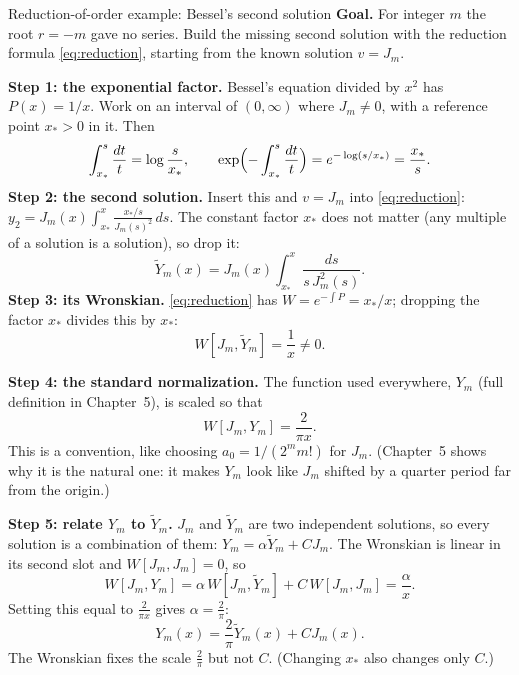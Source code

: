 \documentclass[11pt]{beamer}
\begin{document}
\begin{frame}[allowframebreaks=1.00]{Reduction-of-order example: Bessel's second solution}
\footnotesize
\textbf{Goal.} For integer \(m\) the root \(r=-m\) gave no series. Build the missing second solution
with the reduction formula \eqref{eq:reduction}, starting from the known solution \(v=J_m\).

\textbf{Step 1: the exponential factor.} Bessel's equation divided by \(x^2\) has \(P(x)=1/x\). Work on an
interval of \((0,\infty)\) where \(J_m\ne0\), with a reference point \(x_*>0\) in it. Then
\[
 \int_{x_*}^{s}\frac{dt}{t}=\log\frac{s}{x_*},
 \qquad
 \exp\Bigl(-\int_{x_*}^{s}\frac{dt}{t}\Bigr)=e^{-\log(s/x_*)}=\frac{x_*}{s}.
\]
\textbf{Step 2: the second solution.} Insert this and \(v=J_m\) into \eqref{eq:reduction}:
\(y_2=J_m(x)\int_{x_*}^x\frac{x_*/s}{J_m(s)^2}\,ds\). The constant factor \(x_*\) does not matter (any multiple
of a solution is a solution), so drop it:
\begin{equation}
  \widetilde Y_m(x)=J_m(x)
  \int_{x_*}^{x}\frac{ds}{s\,J_m^2(s)}.
  \label{eq:Ytilde}
\end{equation}
\textbf{Step 3: its Wronskian.} \eqref{eq:reduction} has \(W=e^{-\int P}=x_*/x\); dropping the factor \(x_*\)
divides this by \(x_*\):
\[
 W[J_m,\widetilde Y_m]=\frac1x\neq0 .
\]
\par\framebreak\par
\textbf{Step 4: the standard normalization.} The function used everywhere, \(Y_m\) (full definition in
Chapter~5), is scaled so that
\[
 W[J_m,Y_m]=\frac{2}{\pi x}.
\]
This is a convention, like choosing \(a_0=1/(2^mm!)\) for \(J_m\). (Chapter~5 shows why it is the natural one:
it makes \(Y_m\) look like \(J_m\) shifted by a quarter period far from the origin.)

\textbf{Step 5: relate \(Y_m\) to \(\widetilde Y_m\).} \(J_m\) and \(\widetilde Y_m\) are two independent solutions, so
every solution is a combination of them: \(Y_m=\alpha\widetilde Y_m+CJ_m\). The Wronskian is linear in its
second slot and \(W[J_m,J_m]=0\), so
\[
 W[J_m,Y_m]=\alpha\,W[J_m,\widetilde Y_m]+C\,W[J_m,J_m]=\frac{\alpha}{x}.
\]
Setting this equal to \(\frac2{\pi x}\) gives \(\alpha=\frac2\pi\):
\begin{equation}
 Y_m(x)=\frac2\pi\widetilde Y_m(x)+C J_m(x).
 \label{eq:Ym}
\end{equation}
The Wronskian fixes the scale \(\frac2\pi\) but not \(C\). (Changing \(x_*\) also changes only \(C\).)
\end{frame}
\end{document}
